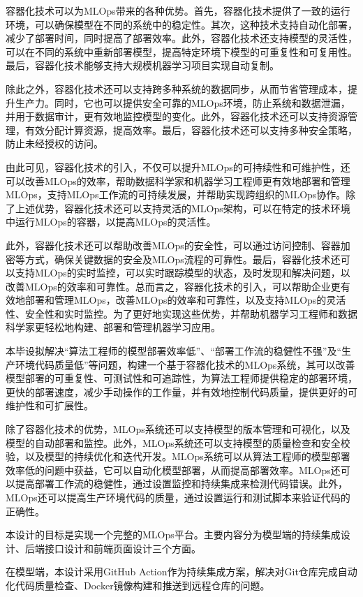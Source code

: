 \documentclass{HDU-Bachelor-Thesis}
\begin{document}
容器化技术可以为MLOps带来的各种优势。首先，容器化技术提供了一致的运行环境，可以确保模型在不同的系统中的稳定性。其次，这种技术支持自动化部署，减少了部署时间，同时提高了部署效率。此外，容器化技术还支持模型的灵活性，可以在不同的系统中重新部署模型，提高特定环境下模型的可重复性和可复用性。最后，容器化技术能够支持大规模机器学习项目实现自动复制。

除此之外，容器化技术还可以支持跨多种系统的数据同步，从而节省管理成本，提升生产力。同时，它也可以提供安全可靠的MLOps环境，防止系统和数据泄漏，并用于数据审计，更有效地监控模型的变化。此外，容器化技术还可以支持资源管理，有效分配计算资源，提高效率。最后，容器化技术还可以支持多种安全策略，防止未经授权的访问。

由此可见，容器化技术的引入，不仅可以提升MLOps的可持续性和可维护性，还可以改善MLOps的效率，帮助数据科学家和机器学习工程师更有效地部署和管理MLOps，支持MLOps工作流的可持续发展，并帮助实现跨组织的MLOps协作。除了上述优势，容器化技术还可以支持灵活的MLOps架构，可以在特定的技术环境中运行MLOps的容器，以提高MLOps的灵活性。

此外，容器化技术还可以帮助改善MLOps的安全性，可以通过访问控制、容器加密等方式，确保关键数据的安全及MLOps流程的可靠性。最后，容器化技术还可以支持MLOps的实时监控，可以实时跟踪模型的状态，及时发现和解决问题，以改善MLOps的效率和可靠性。总而言之，容器化技术的引入，可以帮助企业更有效地部署和管理MLOps，改善MLOps的效率和可靠性，以及支持MLOps的灵活性、安全性和实时监控。为了更好地实现这些优势，并帮助机器学习工程师和数据科学家更轻松地构建、部署和管理机器学习应用。

本毕设拟解决“算法工程师的模型部署效率低”、“部署工作流的稳健性不强”及“生产环境代码质量低”等问题，构建一个基于容器化技术的MLOps系统，其可以改善模型部署的可重复性、可测试性和可追踪性，为算法工程师提供稳定的部署环境，更快的部署速度，减少手动操作的工作量，并有效地控制代码质量，提供更好的可维护性和可扩展性。

除了容器化技术的优势，MLOps系统还可以支持模型的版本管理和可视化，以及模型的自动部署和监控。此外，MLOps系统还可以支持模型的质量检查和安全校验，以及模型的持续优化和迭代开发。MLOps系统可以从算法工程师的模型部署效率低的问题中获益，它可以自动化模型部署，从而提高部署效率。MLOps还可以提高部署工作流的稳健性，通过设置监控和持续集成来检测代码错误。此外，MLOps还可以提高生产环境代码的质量，通过设置运行和测试脚本来验证代码的正确性。

本设计的目标是实现一个完整的MLOps平台。主要内容分为模型端的持续集成设计、后端接口设计和前端页面设计三个方面。

在模型端，本设计采用GitHub Action作为持续集成方案，解决对Git仓库完成自动化代码质量检查、Docker镜像构建和推送到远程仓库的问题。
\end{document}
